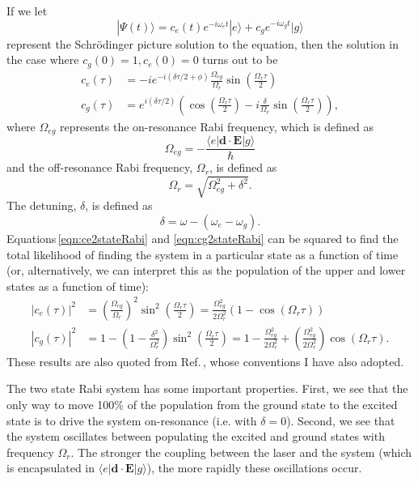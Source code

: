 If we let 
\begin{equation}
|\Psi(t)\rangle = c_e(t)e^{-i\omega_e t}|e\rangle + c_g e^{-i\omega_g t}|g\rangle
\end{equation}
represent the Schr\"odinger picture solution to the equation, then the solution in the case where $c_g(0)=1,c_e(0)=0$ turns out to be 
\begin{align}
c_e(\tau)&=-i e^{-i(\delta \tau/2+\phi)} \frac{\Omega_{eg}}{\Omega_{r}} \sin\left(\frac{\Omega_r \tau}{2}\right)\label{eqn:ce2stateRabi}\\
c_g(\tau)&=e^{i(\delta \tau/2)} \left(
\cos\left(\frac{\Omega_r \tau}{2}\right)
- i\frac{\delta}{\Omega_r} \sin\left(\frac{\Omega_r \tau}{2}\right)\right)
\label{eqn:cg2stateRabi},
\end{align}
where $\Omega_{eg}$ represents the on-resonance Rabi frequency, which is defined as 
\begin{equation}
\Omega_{eg}=-\frac{\langle e |\mathbf{d}\cdot\mathbf{E}|g \rangle }{\hbar}
\end{equation}
and the off-resonance Rabi frequency, $\Omega_r$, is defined as 
\begin{equation}
\Omega_r=\sqrt{\Omega_{eg}^2+\delta^2}.
\end{equation}
The detuning, $\delta$, is defined as 
\begin{equation}
\delta=\omega-(\omega_e-\omega_g).
\end{equation}
Equations\,\ref{eqn:ce2stateRabi} and \ref{eqn:cg2stateRabi} can be squared to find the total likelihood of finding the system in a particular state as a function of time (or, alternatively, we can interpret this as the population of the upper and lower states as a function of time):
\begin{align}
|c_e(\tau)|^2&=\left(\frac{\Omega_{eg}}{\Omega_r}\right)^2 \sin^2\left(\frac{\Omega_r\tau}{2}\right)
=\frac{\Omega_{eg}^2}{2\Omega_r^2}(1-\cos(\Omega_r\tau))\\
|c_g(\tau)|^2&=1-\left(1-\frac{\delta^2}{\Omega_r^2}\right)\sin^2
\left(\frac{\Omega_r \tau}{2}\right)
=1-\frac{\Omega_{eg}^2}{2\Omega_r^2} + \left(\frac{\Omega_{eg}^2}{2\Omega_r^2}\right)\cos(\Omega_r \tau).
\end{align}
These results are also quoted from Ref.\,\cite{Young1997363}, whose conventions I have also adopted.

The two state Rabi system has some important properties. First, we see that the only way to move 100\% of the population from the ground state to the excited state is to drive the system on-resonance (i.e. with $\delta=0$). Second, we see that the system oscillates between populating the excited and ground states with frequency $\Omega_{r}$. The stronger the coupling between the laser and the system (which is encapsulated in $\langle e|\mathbf{d}\cdot\mathbf{E}|g\rangle$), the more rapidly these oscillations occur. 

